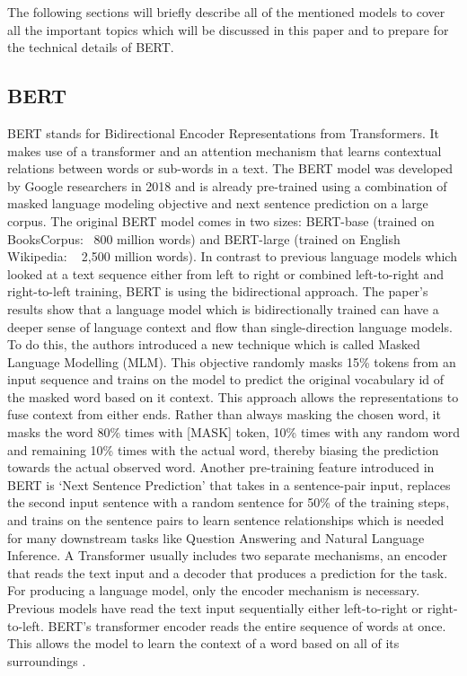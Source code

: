 The following sections will briefly describe all of the mentioned models to cover all the important topics which will be discussed in this paper and to prepare for the technical details of BERT.

\subsection{BERT} \label{bert}
BERT  stands  for  Bidirectional Encoder Representations from Transformers. It makes use of a transformer and an attention mechanism that learns contextual relations between words or sub-words in a text. The BERT model was developed by Google researchers in 2018 and is already pre-trained using a combination of masked language modeling objective and next sentence prediction on a large corpus. The original BERT model comes in two sizes: BERT-base (trained on BooksCorpus: ~800 million words) and BERT-large (trained on English Wikipedia: ~ 2,500 million words). 
In contrast to previous language models which looked at a text sequence either from left to right or combined left-to-right and right-to-left training, BERT is using the bidirectional approach. The paper’s results show that a language model which is bidirectionally trained can have a deeper sense of language context and flow than single-direction language models. To do this, the authors introduced a new technique which is called Masked Language Modelling (MLM). \alert{This objective randomly masks 15\% tokens from an input sequence and trains on the model to predict the original vocabulary id of the masked word based on it context. This approach allows the representations to fuse context from either ends. Rather than always masking the chosen word, it masks the word 80\% times with [MASK] token, 10\% times with any random word and remaining 10\% times with the actual word, thereby biasing the prediction towards the actual observed word. Another pre-training feature introduced in BERT is ‘Next Sentence Prediction’ that takes in a sentence-pair input, replaces the second input sentence with a random sentence for 50\% of the training steps, and trains on the sentence pairs to learn sentence relationships which is needed for many downstream tasks like Question Answering and Natural Language Inference.} \newline
A Transformer usually includes two separate mechanisms, an encoder that reads the text input and a decoder that produces a prediction for the task. For producing a language model, only the encoder mechanism is necessary. Previous models have read the text input sequentially either left-to-right or right-to-left. BERT's transformer encoder reads the entire sequence of words at once. This allows the model to learn the context of a word based on all of its surroundings\alert{ \cite{Devlin}}.  \newline
